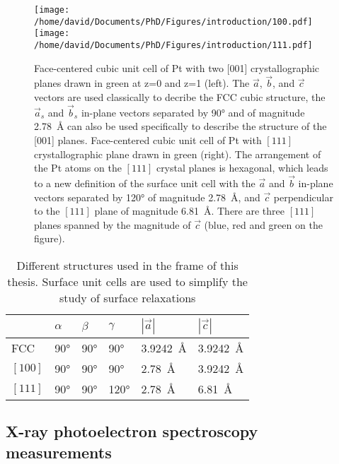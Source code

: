 \begin{figure}[!htb]
    \centering
    \texttt{[image: /home/david/Documents/PhD/Figures/introduction/100.pdf]}
    \texttt{[image: /home/david/Documents/PhD/Figures/introduction/111.pdf]}
    \caption{
        Face-centered cubic unit cell of Pt with two [001] crystallographic planes drawn in green at z=0 and z=1 (left).
        The $\vec{a}$, $\vec{b}$, and $\vec{c}$ vectors are used classically to decribe the FCC cubic structure, the $\vec{a}_s$ and $\vec{b}_s$ in-plane vectors separated by \ang{90} and of magnitude \qty{2.78}{\angstrom} can also be used specifically to describe the structure of the [001] planes.
        Face-centered cubic unit cell of Pt with $[111]$ crystallographic plane drawn in green (right).
        The arrangement of the Pt atoms on the $[111]$ crystal planes is hexagonal, which leads to a new definition of the surface unit cell with the $\vec{a}$ and $\vec{b}$ in-plane vectors separated by \ang{120} of magnitude \qty{2.78}{\angstrom}, and $\vec{c}$ perpendicular to the $[111]$ plane of magnitude \qty{6.81}{\angstrom}.
        There are three $[111]$ planes spanned by the magnitude of $\vec{c}$ (blue, red and green on the figure).
    }
    \label{fig:Cubic100Hex111}
\end{figure}

\begin{table}[]
\centering
\begin{tabular}{@{}llllll@{}}
\toprule
     & $\alpha$ & $\beta$ & $\gamma$ & $|\vec{a}|$ & $|\vec{c}|$ \\
\midrule
FCC & \ang{90} & \ang{90} & \ang{90} & \qty{3.9242}{\angstrom} & \qty{3.9242}{\angstrom} \\
$[100]$ & \ang{90} & \ang{90} & \ang{90} & \qty{2.78}{\angstrom} & \qty{3.9242}{\angstrom} \\
$[111]$ & \ang{90} & \ang{90} & \ang{120} & \qty{2.78}{\angstrom} & \qty{6.81}{\angstrom} \\
\bottomrule
\end{tabular}%
\caption{
    Different structures used in the frame of this thesis.
    Surface unit cells are used to simplify the study of surface relaxations
    }
\label{tab:Structures}
\end{table}

\subsection{X-ray photoelectron spectroscopy measurements} \label{sec:XPS111}

